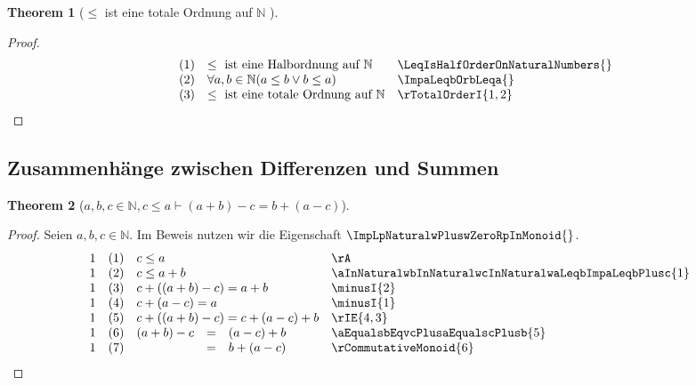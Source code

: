 \documentclass{book}
\theoremstyle{plain}
\newtheorem{theorem}{Theorem}
\theoremstyle{remark}
\theoremstyle{definition}
\begin{document}
\label{LeqIsTotalOrderOnNaturalNumbers}
\begin{theorem}[\(\leq\) ist eine totale Ordnung auf \(\mathbb{N}\) ]
\end{theorem}
\begin{proof}
\[
\begin{array}{llll}
            & (1) & \leq \text{ ist eine Halbordnung auf } \mathbb{N}  & \LeqIsHalfOrderOnNaturalNumbers{} \\
            & (2) & \forall a, b \in \mathbb{N}  (a \leq b \lor b \leq a) & \ImpaLeqbOrbLeqa{} \\
          & (3) & \leq \text{ ist eine totale Ordnung auf } \mathbb{N} & \rTotalOrderI{1,2}
\end{array}
\]
\end{proof}

\subsection{Zusammenhänge zwischen Differenzen und Summen}

\label{awbwcInNaturalwcLeqaImpLpaPlusbRpMinuscEqualsbPlusLpaMinuscRp}
\begin{theorem}[\(a,b,c\in\mathbb{N},c\leq a\vdash (a+b)-c=b+(a-c)\)]
\end{theorem}
\begin{proof}
Seien \(a, b, c \in \mathbb{N}\). Im Beweis nutzen wir die Eigenschaft \(\ImpLpNaturalwPluswZeroRpInMonoid{}\).
\[
\begin{array}{llclll}
          1  & (1) & \multicolumn{3}{l}{c\leq a}  & \rA \\
          1  & (2) & \multicolumn{3}{l}{c\leq a+b}  & \aInNaturalwbInNaturalwcInNaturalwaLeqbImpaLeqbPlusc{1} \\
          1  & (3) & \multicolumn{3}{l}{c+((a+b)-c)=a+b} & \minusI{2} \\
          1  & (4) & \multicolumn{3}{l}{c+(a-c)=a} & \minusI{1} \\
          1  & (5) & \multicolumn{3}{l}{c+((a+b)-c)=c+(a-c)+b} & \rIE{4,3} \\
          1  & (6) & (a+b)-c&=&(a-c)+b & \aEqualsbEqvcPlusaEqualscPlusb{5} \\
          1  & (7) & &=&b+(a-c) & \rCommutativeMonoid{6} \\
\end{array}
\]
\end{proof}
\end{document}
